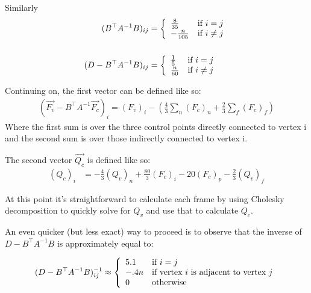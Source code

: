 \documentclass{article}
\begin{document}
Similarly
\begin{align*}
(B^{\top}A^{-1}B)_{ij} &= \left\{ 
  \begin{array}{l l}
    \frac{8}{35} & \text{if $i=j$}\\
    -\frac{n}{105} & \text{if $i\neq j$}\\
  \end{array} \right.  \\
  \\
(D-B^{\top}A^{-1}B)_{ij} &= \left\{ 
  \begin{array}{l l}
    \frac{1}{5} & \text{if $i=j$}\\
    \frac{n}{60} & \text{if $i\neq j$}\\
  \end{array} \right.  \\
\end{align*}

Continuing on, the first vector can be defined like so:
\begin{align*}
\left( \vec{F_v} - B^{\top}A^{-1}\vec{F_c} \right)_i= (F_v)_i - \left( \frac{4}{3} \sum_{n} (F_c)_n + \frac{2}{3} \sum_{f} (F_c)_f \right)
\end{align*}
Where the first sum is over the three control points directly connected to vertex i and the 
second sum is over those indirectly connected to vertex i. 

The second vector $\vec{Q_c}$ is defined like so:
\begin{align*}
(Q_c)_i &= -\frac{4}{3} (Q_v)_n + \frac{80}{3} (F_{c})_i - 20 (F_c)_{p} - \frac{2}{3} (Q_v)_f  
\end{align*}

At this point it's straightforward to calculate each frame by using Cholesky decomposition 
to quickly solve for $Q_v$ and use that to calculate $Q_c$.

An even quicker (but less exact) way to proceed is to observe that the inverse of 
$D - B^{\top}A^{-1}B$ is approximately equal to:

\begin{align*}
(D-B^{\top}A^{-1}B)^{-1}_{ij} &\approx \left\{ 
  \begin{array}{l l}
    5.1 & \text{if $i=j$}\\
    -.4 n & \text{if vertex $i$ is adjacent to vertex $j$}\\
    0 & \text{otherwise}\\
  \end{array} \right.  \\
\end{align*}
\end{document}
